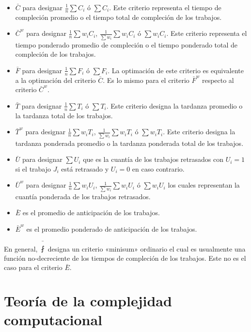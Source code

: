 \documentclass[spanish,draft,12pt,headsepline,footsepline,paper=letter]{scrreprt}
\begin{document}
\begin{itemize}
  \item $\bar{C}$ para designar $\frac{1}{n}\sum C_i$ ó $\sum C_i$. Este criterio representa el tiempo de compleción promedio o el tiempo total de compleción de los trabajos.
  \item $\bar{C}^w$ para designar $\frac{1}{n} \sum w_iC_i$, $\frac{1}{\sum w_i}\sum w_iC_i$ ó $\sum w_iC_i$. Este criterio representa el tiempo ponderado promedio de compleción o el tiempo ponderado total de compleción de los trabajos.
  \item $\bar{F}$ para designar $ \frac{1}{n}\sum F_i $ ó $\sum F_i$. La optimación de este criterio es equivalente a la optimación del criterio $\bar{C}$. Es lo mismo para el criterio $\bar{F}^w$ respecto al criterio $\bar{C}^w$.
  \item $\bar{T}$ para designar $\frac{1}{n}\sum T_i$ ó $\sum T_i$. Este criterio designa la tardanza promedio o la tardanza total de los trabajos.
  \item $\bar{T}^w$ para designar $\frac{1}{n}\sum w_iT_i$, $\frac{1}{\sum w_i}\sum w_iT_i$ ó $\sum w_iT_i$. Este criterio designa la tardanza ponderada promedio o la tardanza ponderada total de los trabajos.
  \item $\bar{U}$ para designar $\sum U_i$ que es la cuantía de los trabajos retrasados con $U_i=1$ si el trabajo $J_i$ está retrasado y $U_i=0$ en caso contrario.
  \item $\bar{U}^w$ para designar $\frac{1}{n}\sum w_iU_i$, $\frac{1}{\sum w_i}\sum w_iU_i$ ó $\sum w_iU_i$ los cuales representan la cuantía ponderada de los trabajos retrasados.
  \item $\bar{E}$ es el promedio de anticipación de los trabajos.
  \item $\bar{E}^w$ es el promedio ponderado de anticipación de los trabajos.
\end{itemize}

En general, $\bar{\fint}$ designa un criterio «minisum» ordinario el cual es usualmente una función no\nobreakdash-decreciente de los tiempos de compleción de los trabajos. Este no es el caso para el criterio $\bar{E}$.

\section{Teoría de la complejidad computacional} %
\label{teoria_complejidad_computacional}
\end{document}
